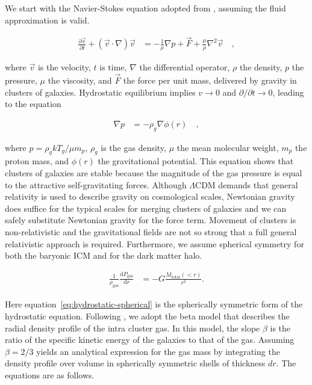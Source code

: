 \documentclass[MScProj_TLRH_ClusterEnergy.tex]{subfiles}
\begin{document}
We start with the Navier-Stokes equation adopted from \citet[eq. (3.52) on p. 47]
{1998pfp..book.....C}, assuming the fluid approximation is valid.

\begin{align}
    \frac{\partial \vec{v}}{\partial t} + (\vec{v}\cdot \nabla)\vec{v}
        &= - \frac{1}{\rho}\nabla p + \vec{F} + \frac{\mu}{\rho} \nabla^2\vec{v}
        \label{eq:navier-stokes} \quad ,
\end{align}

\noindent where $\vec{v}$ is the velocity, $t$ is time, $\nabla$ the differential
operator, $\rho$ the density, $p$ the pressure, $\mu$ the viscosity, and $\vec{F}$
the force per unit mass, delivered by gravity in clusters of galaxies. Hydrostatic 
equilibrium implies $v \rightarrow 0$ and $\partial/\partial t \rightarrow 0$,
leading to the equation

\begin{align}
    \nabla p &= -\rho_g \nabla \phi(r)  \quad , \label{eq:hydrostatic}
\end{align}

\noindent where $p=\rho_g k T_g / \mu m_p$, $\rho_g$ is the gas density, $\mu$ 
the mean molecular weight, $m_p$ the proton mass, and $\phi(r)$ the gravitational
potential. This equation shows that clusters of galaxies are stable because 
the magnitude of the gas pressure is equal to the attractive self-gravitating
forces. Although $\Lambda$CDM demands that general relativity is
used to describe gravity on cosmological scales, Newtonian gravity does suffice 
for the typical scales for merging clusters of galaxies and we can safely substitute  
Newtonian gravity for the force term. Movement of clusters is non-relativistic
and the gravitational fields are not so strong that a full general relativistic
approach is required. Furthermore, we assume spherical symmetry for both the 
baryonic ICM and for the dark matter halo.

\begin{align}
    \frac{1}{\rho_{\text{gas}}} \frac{\mathrm{d}P_{\text{gas}}}{\mathrm{d}r}
        &= -G \frac{M_{\text{total}}(<r)}{r^2} \label{eq:hydrostatic-spherical}.
\end{align}

Here equation~\eqref{eq:hydrostatic-spherical} is the spherically symmetric form
of the hydrostatic equation. Following \citet{2014MNRAS.438.1971D}, we adopt
the beta model \citep{1978A&A....70..677C} that describes the radial density
profile of the intra cluster gas. In this model, the slope $\beta$ is the ratio
of the specific kinetic energy of the galaxies to that of the gas. Assuming 
$\beta = 2/3$ \citep{2008MNRAS.389..967M} yields an analytical expression for 
the gas mass by integrating the density profile over volume in spherically symmetric
shells of thickness $dr$. The equations are as follows.
\end{document}
